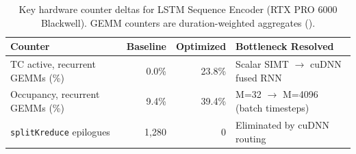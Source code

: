 \begin{table}[h]
\centering
\caption{Key hardware counter deltas for LSTM Sequence Encoder (RTX PRO 6000 Blackwell).
  GEMM counters are duration-weighted aggregates ().}
\label{tab:lstm_counters}
\small
\setlength{\tabcolsep}{4pt}
\begin{tabular}{lrrl}
\toprule
\textbf{Counter} & \textbf{Baseline} & \textbf{Optimized} & \textbf{Bottleneck Resolved} \\
\midrule
TC active, recurrent GEMMs (\%)  & 0.0\%   & 23.8\% & Scalar SIMT $\to$ cuDNN fused RNN \\
Occupancy, recurrent GEMMs (\%)  & 9.4\%   & 39.4\% & M=32 $\to$ M=4096 (batch timesteps) \\
\texttt{splitKreduce} epilogues  & 1{,}280 & 0      & Eliminated by cuDNN routing \\
\bottomrule
\end{tabular}
\end{table}
